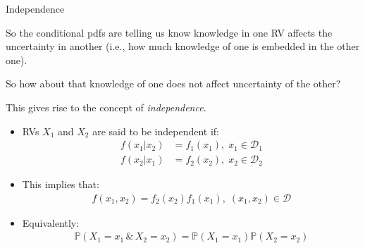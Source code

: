 \documentclass[9pt]{beamer}
\begin{document}
%
\begin{frame}{Independence}

So the conditional pdfs are telling us know knowledge in one RV affects the uncertainty in another (i.e., how much knowledge of one is embedded in the other one). 
\begin{block}{}
So how about that knowledge of one does not affect uncertainty of the other? 
\end{block}
This gives rise to the concept of {\em independence}.
\begin{itemize}
\item RVs $X_1$ and $X_2$ are said to be independent if:
\begin{align*}
f(x_1|x_2)&=f_1(x_1),\; x_1\in \mathcal{D}_1\\
f(x_2|x_1)&=f_2(x_2),\; x_2\in \mathcal{D}_2
\end{align*}
\item This implies that:
 \begin{align*}
{f(x_1,x_2)}={f_2(x_2)}f_1(x_1),\; (x_1,x_2)\in \mathcal{D}
\end{align*}
\item Equivalently:
 \begin{align*}
\mathbb{P}(X_1=x_1\,\&\,X_2=x_2)=\mathbb{P}(X_1=x_1)\mathbb{P}(X_2=x_2)
\end{align*}

\end{itemize}

\end{frame}
\end{document}
